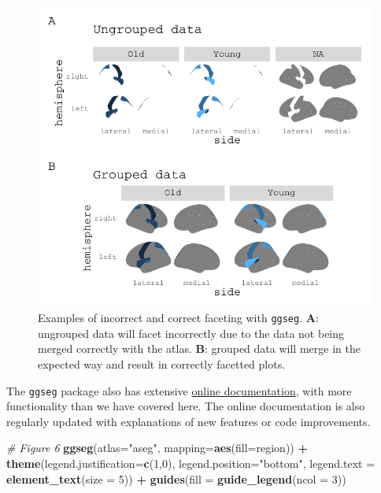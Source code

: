 \documentclass[fleqn,10pt]{wlpeerj} %
\newenvironment{Shaded}{\begin{snugshade}}{\end{snugshade}}
\newcommand{\CommentTok}[1]{\textcolor[rgb]{0.56,0.35,0.01}{\textit{#1}}}
\newcommand{\DataTypeTok}[1]{\textcolor[rgb]{0.13,0.29,0.53}{#1}}
\newcommand{\DecValTok}[1]{\textcolor[rgb]{0.00,0.00,0.81}{#1}}
\newcommand{\KeywordTok}[1]{\textcolor[rgb]{0.13,0.29,0.53}{\textbf{#1}}}
\newcommand{\NormalTok}[1]{#1}
\newcommand{\OperatorTok}[1]{\textcolor[rgb]{0.81,0.36,0.00}{\textbf{#1}}}
\newcommand{\StringTok}[1]{\textcolor[rgb]{0.31,0.60,0.02}{#1}}
\begin{document}
\begin{figure}[H]
\includegraphics[width=1\linewidth]{msc_ggseg_files/figure-latex/figure5-1} \caption{Examples of incorrect and correct faceting with \texttt{ggseg}. \textbf{A}: ungrouped data will facet incorrectly due to the data not being merged correctly with the atlas. \textbf{B}: grouped data will merge in the expected way and result in correctly facetted plots.}\label{fig:figure5}
\end{figure}

The \texttt{ggseg} package also has extensive \href{https://lcbc-uio.github.io/ggseg/}{online documentation}, with more functionality than we have covered here.
The online documentation is also regularly updated with explanations of new features or code improvements.



\begin{Shaded}
\begin{Highlighting}[]
\CommentTok{# Figure 6}
\KeywordTok{ggseg}\NormalTok{(}\DataTypeTok{atlas=}\StringTok{"aseg"}\NormalTok{, }\DataTypeTok{mapping=}\KeywordTok{aes}\NormalTok{(}\DataTypeTok{fill=}\NormalTok{region)) }\OperatorTok{+}
\StringTok{  }\KeywordTok{theme}\NormalTok{(}\DataTypeTok{legend.justification=}\KeywordTok{c}\NormalTok{(}\DecValTok{1}\NormalTok{,}\DecValTok{0}\NormalTok{),}
        \DataTypeTok{legend.position=}\StringTok{"bottom"}\NormalTok{,}
        \DataTypeTok{legend.text =} \KeywordTok{element_text}\NormalTok{(}\DataTypeTok{size =} \DecValTok{5}\NormalTok{)) }\OperatorTok{+}
\StringTok{  }\KeywordTok{guides}\NormalTok{(}\DataTypeTok{fill =} \KeywordTok{guide_legend}\NormalTok{(}\DataTypeTok{ncol =} \DecValTok{3}\NormalTok{))}
\end{Highlighting}
\end{Shaded}
\end{document}

